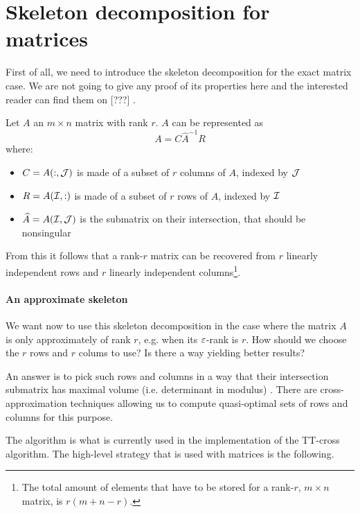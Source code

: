\section{Skeleton decomposition for matrices}
First of all, we need to introduce the skeleton decomposition for the exact matrix case. We are not going to give any proof of its properties here and the interested reader can find them on [???] .

\begin{Teo}
  Let $A$ an $m \times n$ matrix with rank $r$. $A$ can be represented as
  \begin{equation} \label{def:skeleton}
    A = C \hat{A}^{-1} R
  \end{equation}
  where:
  \begin{itemize}
  \item $C = A(:,\mathcal{J})$ is made of a subset of $r$ columns of $A$, indexed by $\mathcal{J}$
  \item $R = A(\mathcal{I},:)$ is made of a subset of $r$ rows of $A$, indexed by $\mathcal{I}$
  \item $\widehat{A} = A(\mathcal{I},\mathcal{J})$ is the submatrix on their intersection, that should be nonsingular
  \end{itemize}
\end{Teo}

From this it follows that a rank-$r$ matrix can be recovered from $r$ linearly independent rows and $r$ linearly independent columns\footnote{The total amount of elements that have to be stored for a rank-$r$, $m \times n$ matrix, is $r(m+n-r)$.}.

\paragraph{An approximate skeleton}
We want now to use this skeleton decomposition in the case where the matrix $A$ is only approximately of rank $r$, e.g. when its $\varepsilon$-rank is $r$.
How should we choose the $r$ rows and $r$ colums to use? Is there a way yielding better results?

An answer is to pick such rows and columns in a way that their intersection submatrix has maximal volume (i.e. determinant in modulus) . There are cross-approximation techniques allowing us to compute quasi-optimal sets of rows and columns for this purpose.

The  algorithm is what is currently used in the implementation of the TT-cross algorithm.
The high-level strategy that is used with matrices is the following.

